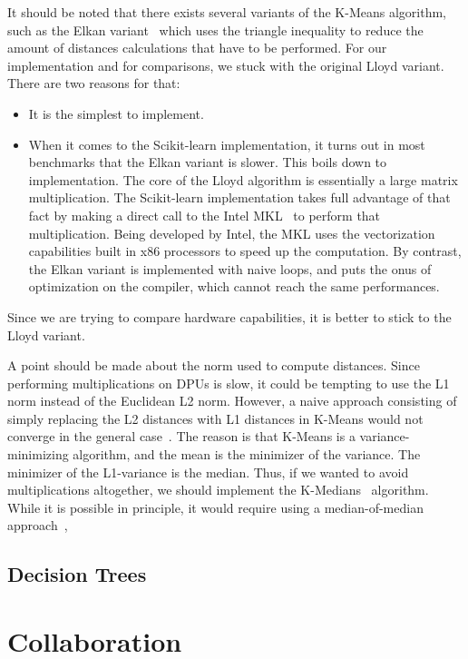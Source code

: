 It should be noted that there exists several variants of the K-Means algorithm, such as the Elkan variant~\cite{elkan2003using} which uses the triangle inequality to reduce the amount of distances calculations that have to be performed. For our implementation and for comparisons, we stuck with the original Lloyd variant. There are two reasons for that:
\begin{itemize}
    \item It is the simplest to implement.
    \item When it comes to the Scikit-learn implementation, it turns out in most benchmarks that the Elkan variant is slower. This boils down to implementation. The core of the Lloyd algorithm is essentially a large matrix multiplication. The Scikit-learn implementation takes full advantage of that fact by making a direct call to the Intel MKL~\cite{mkl} to perform that multiplication. Being developed by Intel, the MKL uses the vectorization capabilities built in x86 processors to speed up the computation. By contrast, the Elkan variant is implemented with naive loops, and puts the onus of optimization on the compiler, which cannot reach the same performances.
\end{itemize}
Since we are trying to compare hardware capabilities, it is better to stick to the Lloyd variant.

A point should be made about the norm used to compute distances. Since performing multiplications on DPUs is slow, it could be tempting to use the L1 norm instead of the Euclidean L2 norm. However, a naive approach consisting of simply replacing the L2 distances with L1 distances in K-Means would not converge in the general case~\cite{bradley1996clustering}. The reason is that K-Means is a variance-minimizing algorithm, and the mean is the minimizer of the variance. The minimizer of the L1-variance is the median. Thus, if we wanted to avoid multiplications altogether, we should implement the K-Medians~\cite{jain1988algorithms} algorithm. While it is possible in principle, it would require using a median-of-median approach~\cite{blum1973time}, 

\subsection{Decision Trees}

\section{Collaboration}

